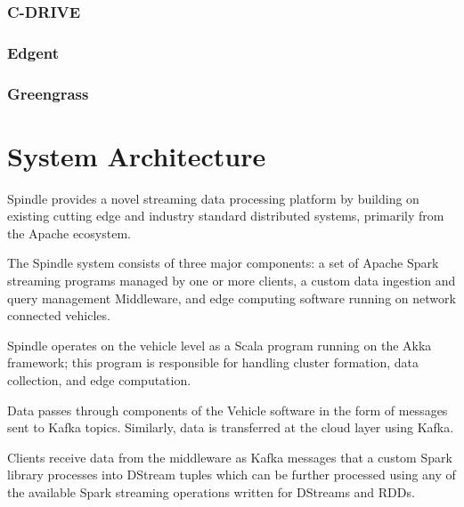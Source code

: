 \documentclass{thesis}
\begin{document}
    \subsection{C-DRIVE} %
    \subsection{Edgent} %
    \subsection{Greengrass} %

%


\chapter{System Architecture}
    Spindle provides a novel streaming data processing platform by building on
    existing cutting edge and industry standard distributed systems, primarily
    from the Apache ecosystem. 

    The Spindle system consists of three major components: a set of Apache Spark %
    streaming programs managed by one or more clients, a custom data ingestion and
    query management Middleware, and edge computing software running on network
    connected vehicles.
    
    Spindle operates on the vehicle level as a Scala
    \cite{scala} program running on the Akka \cite{akka} framework; this program
    is responsible for handling cluster formation, data collection, and edge
    computation.

    Data passes through components of the Vehicle software in the form of 
    messages sent to Kafka \cite{kafka} topics. Similarly, data is transferred
    at the cloud layer using Kafka.

    Clients receive data from the middleware as Kafka messages that a custom Spark \cite{spark}
    library processes into DStream tuples which can be further processed using any of the available
    Spark streaming operations written for DStreams and RDDs.
\end{document}
